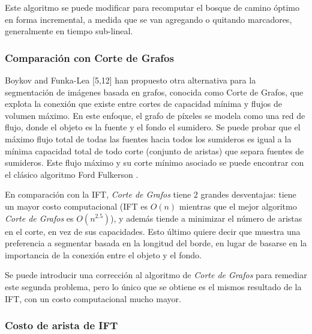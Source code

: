 \documentclass[a4paper,10pt]{article}
\begin{document}
Este algoritmo se puede modificar para recomputar el bosque de camino óptimo 
en forma incremental, a medida que se van agregando o quitando marcadores, 
generalmente en tiempo sub-lineal.

\subsubsection{Comparación con Corte de Grafos}

Boykov and Funka-Lea [5,12] han propuesto otra alternativa para la segmentación
de imágenes basada en grafos, conocida como Corte de Grafos, que explota 
la conexión que existe entre cortes de capacidad mínima y flujos de volumen
máximo. En este enfoque, el grafo de píxeles se modela como una red de flujo,
donde el objeto es la fuente y el fondo el sumidero. Se puede probar que el máximo flujo total de todas las fuentes
hacia todos los sumideros es igual a la mínima capacidad total de todo corte 
(conjunto de aristas) que separa fuentes de sumideros. Este flujo máximo y su 
corte mínimo asociado se puede encontrar con el clásico algoritmo 
Ford Fulkerson \cite{Cormen:2009:IAT:1614191}.

En comparación con la IFT, \textit{Corte de Grafos} tiene 2 grandes desventajas: 
tiene un mayor costo computacional (IFT es $O(n)$ mientras que
el mejor algoritmo \textit{Corte de Grafos} es $O(n^{2.5})$), y además tiende a
minimizar el número de aristas en el corte, en vez de sus capacidades. Esto 
último quiere decir que muestra una preferencia a segmentar basada en la 
longitud del borde, en lugar de basarse en la importancia de la conexión 
entre el objeto y el fondo.\cite{journals/jmiv/MirandaF09}

Se puede introducir una corrección al algoritmo de \textit{Corte de Grafos} para 
remediar este segunda problema, pero lo único que se obtiene es el mismos 
resultado de la IFT, con un costo computacional mucho mayor. \cite{journals/jmiv/MirandaF09}

\subsubsection{Costo de arista de IFT}
\end{document}

